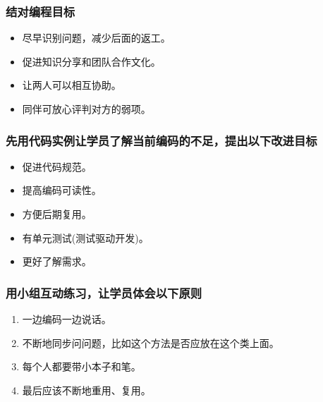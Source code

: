 \hypertarget{ux7ed3ux5bf9ux7f16ux7a0bux76eeux6807}{%
\subsubsection{结对编程目标}\label{ux7ed3ux5bf9ux7f16ux7a0bux76eeux6807}}

\begin{itemize}
\tightlist
\item
  尽早识别问题，减少后面的返工。
\item
  促进知识分享和团队合作文化。
\item
  让两人可以相互协助。
\item
  同伴可放心评判对方的弱项。\\
\end{itemize}

\hypertarget{ux5148ux7528ux4ee3ux7801ux5b9eux4f8bux8ba9ux5b66ux5458ux4e86ux89e3ux5f53ux524dux7f16ux7801ux7684ux4e0dux8db3ux63d0ux51faux4ee5ux4e0bux6539ux8fdbux76eeux6807}{%
\subsubsection{先用代码实例让学员了解当前编码的不足，提出以下改进目标}\label{ux5148ux7528ux4ee3ux7801ux5b9eux4f8bux8ba9ux5b66ux5458ux4e86ux89e3ux5f53ux524dux7f16ux7801ux7684ux4e0dux8db3ux63d0ux51faux4ee5ux4e0bux6539ux8fdbux76eeux6807}}

\begin{itemize}
\tightlist
\item
  促进代码规范。
\item
  提高编码可读性。
\item
  方便后期复用。
\item
  有单元测试(测试驱动开发)。
\item
  更好了解需求。
\end{itemize}

\hypertarget{ux7528ux5c0fux7ec4ux4e92ux52a8ux7ec3ux4e60ux8ba9ux5b66ux5458ux4f53ux4f1aux4ee5ux4e0bux539fux5219}{%
\subsubsection{用小组互动练习，让学员体会以下原则}\label{ux7528ux5c0fux7ec4ux4e92ux52a8ux7ec3ux4e60ux8ba9ux5b66ux5458ux4f53ux4f1aux4ee5ux4e0bux539fux5219}}

\begin{enumerate}
\tightlist
\item
  一边编码一边说话。\\
\item
  不断地同步问问题，比如这个方法是否应放在这个类上面。\\
\item
  每个人都要带小本子和笔。\\
\item
  最后应该不断地重用、复用。\\
\end{enumerate}

